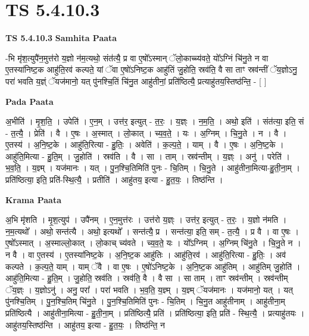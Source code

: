 \documentclass[17pt]{extarticle}
\begin{document}
\section{ TS 5.4.10.3 }

\textbf{TS 5.4.10.3 } \newline
\textbf{Samhita Paata} \newline

-भि मृ॑श॒त्युपै॑न॒मुत्त॑रो य॒ज्ञो न॑म॒त्यथो॒ संत॑त्यै॒ प्र वा ए॒षो᳚ऽस्मान् ॅलो॒काच्च्य॑वते॒ यो᳚ऽग्निं चि॑नु॒ते न वा ए॒तस्या॑निष्ट॒क आहु॑ति॒रव॑ कल्पते॒ यां ॅवा ए॒षो॑ऽनिष्ट॒क आहु॑तिं जु॒होति॒ स्रव॑ति॒ वै सा ताꣳ स्रव॑न्तीं ॅय॒ज्ञोऽनु॒ परा॑ भवति य॒ज्ञ्ं ॅयज॑मानो॒ यत् पु॑नश्चि॒तिं चि॑नु॒त आहु॑तीनां॒ प्रति॑ष्ठित्यै॒ प्रत्याहु॑तय॒स्तिष्ठ॑न्ति॒ - [  ] \newline

\textbf{Pada Paata} \newline

अ॒भीति॑ । मृ॒श॒ति॒ । उपेति॑ । ए॒न॒म् । उत्त॑र॒ इत्युत् - त॒रः॒ । य॒ज्ञ्ः । न॒म॒ति॒ । अथो॒ इति॑ । संत॑त्या॒ इति॒ सं - त॒त्यै॒ । प्रेति॑ । वै । ए॒षः । अ॒स्मात् । लो॒कात् । च्य॒व॒ते॒ । यः । अ॒ग्निम् । चि॒नु॒ते । न । वै । ए॒तस्य॑ । अ॒नि॒ष्ट॒के । आहु॑ति॒रित्या - हु॒तिः॒ । अवेति॑ । क॒ल्प॒ते॒ । याम् । वै । ए॒षः । अ॒नि॒ष्ट॒के । आहु॑ति॒मित्या - हु॒ति॒म् । जु॒होति॑ । स्रव॑ति । वै । सा । ताम् । स्रव॑न्तीम् । य॒ज्ञ्ः । अनु॑ । परेति॑ । भ॒व॒ति॒ । य॒ज्ञ्म् । यज॑मानः । यत् । पु॒न॒श्चि॒तिमिति॑ पुनः - चि॒तिम् । चि॒नु॒ते । आहु॑तीना॒मित्या-हु॒ती॒ना॒म् । प्रति॑ष्ठित्या॒ इति॒ प्रति॑-स्थि॒त्यै॒ । प्रतीति॑ । आहु॑तय॒ इत्या - हु॒त॒यः॒ । तिष्ठ॑न्ति ।  \newline


\textbf{Krama Paata} \newline

अ॒भि मृ॑शति । मृ॒श॒त्युप॑ । उपै॑नम् । ए॒न॒मुत्त॑रः । उत्त॑रो य॒ज्ञ्ः । उत्त॑र॒ इत्युत् - त॒रः॒ । य॒ज्ञो न॑मति । न॒म॒त्यथो᳚ । अथो॒ सन्त॑त्यै । अथो॒ इत्यथो᳚ । सन्त॑त्यै॒ प्र । सन्त॑त्या॒ इति॒ सम् - त॒त्यै॒ । प्र वै । वा ए॒षः । ए॒षो᳚ऽस्मात् । अ॒स्माल्लो॒कात् । लो॒काच् च्य॑वते । च्य॒व॒ते॒ यः । यो᳚ऽग्निम् । अ॒ग्निम् चि॑नु॒ते । चि॒नु॒ते न । न वै । वा ए॒तस्य॑ । ए॒तस्या॑निष्ट॒के । अ॒नि॒ष्ट॒क आहु॑तिः । आहु॑ति॒रव॑ । आहु॑ति॒रित्या - हु॒तिः॒ । अव॑ कल्पते । क॒ल्प॒ते॒ याम् । याम् ॅवै । वा ए॒षः । ए॒षो॑ऽनिष्ट॒के । अ॒नि॒ष्ट॒क आहु॑तिम् । आहु॑तिम् जु॒होति॑ । आहु॑ति॒मित्या - हु॒ति॒म् । जु॒होति॒ स्रव॑ति । स्रव॑ति॒ वै । वै सा । सा ताम् । ताꣳ स्रव॑न्तीम् । स्रव॑न्तीम् ॅय॒ज्ञ्ः । य॒ज्ञोऽनु॑ । अनु॒ परा᳚ । परा॑ भवति । भ॒व॒ति॒ य॒ज्ञ्म् । य॒ज्ञ्म् ॅयज॑मानः । यज॑मानो॒ यत् । यत् पु॑नश्चि॒तिम् । पु॒न॒श्चि॒तिम् चि॑नु॒ते । पु॒न॒श्चि॒तिमिति॑ पुनः - चि॒तिम् । चि॒नु॒त आहु॑तीनाम् । आहु॑तीना॒म् प्रति॑ष्ठित्यै । आहु॑तीना॒मित्या - हु॒ती॒ना॒म् । प्रति॑ष्ठित्यै॒ प्रति॑ । प्रति॑ष्ठित्या॒ इति॒ प्रति॑ - स्थि॒त्यै॒ । प्रत्याहु॑तयः । आहु॑तय॒स्तिष्ठ॑न्ति । आहु॑तय॒ इत्या - हु॒त॒यः॒ । तिष्ठ॑न्ति॒ न \newline
\end{document}

